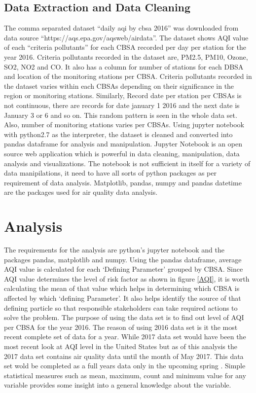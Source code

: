 \documentclass[sigconf]{acmart}
\begin{document}
{  \subsection{Data Extraction and Data Cleaning} The comma separated dataset ``daily aqi by cbsa 2016'' was downloaded from data source ``https://aqs.epa.gov/aqsweb/airdata''. The dataset shows AQI value of each ``criteria pollutants'' for each CBSA recorded per day per station for the year 2016. Criteria pollutants recorded in the dataset are, PM2.5, PM10, Ozone, SO2, NO2 and CO. It also has a column for number of stations for each DBSA and location of the monitoring stations per CBSA.
  Criteria pollutants recorded in the dataset varies within each CBSAs depending on their significance in the region or monitoring stations. Similarly, Record date per station per CBSAs is not continuous, there are records for date january 1 2016 and the next date is January 3 or 6 and so on. This random pattern is seen in the whole data set. Also, number of monitoring stations varies per CBSAs.
  Using jupyter notebook with python2.7 as the interpreter, the dataset is cleaned and converted  into pandas dataframe for analysis and manipulation. Jupyter Notebook is an open source web application which is powerful in data cleaning, manipulation, data analysis and visualizations. The notebook is not sufficient in itself for a variety of data manipilations, it need to have all sorts of python packages as per requirement of data analysis. Matplotlib, pandas, numpy and pandas datetime are the packages used for air quality data analysis.
  
  \section{Analysis} The requirements for the analysis are python's jupyter notebook and the packages pandas, matplotlib and numpy. Using the pandas dataframe, average AQI value is calculated for each `Defining Parameter' grouped by CBSA.  Since AQI value determines the level of risk factor as shown in figure \ref{AQI}, it is worth calculating the mean of that value which helps in determining which CBSA is affected by which `defining Parameter'. It also helps identify the source of that defining particle so that responsible stakeholders can take required actions to solve the problem. The purpose of using the data set is to find out level of AQI per CBSA  for the year 2016. The reason of using 2016 data set is it the most recent complete set of data for a year. While 2017 data set would have been the most recent look at AQI level in the United States but as of this analysis the 2017 data set contains air quality data until the month of May 2017. This data set wold be completed as a full years data only in the upcoming spring \cite{outdoor-air}.
  Simple statistical measures such as mean, maximum, count and minimum value for any variable provides some insight into a general knowledge about the variable.
  
}
\end{document}

